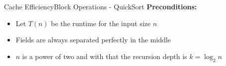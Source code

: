 


\begin{frame}{Cache Efficiency}{Block Operations - QuickSort}
  \textbf{Preconditions:}
  \begin{itemize}
    \item
      Let {\color{Mittel-Blau}$T(n)$} be the runtime for the
      {\color{Mittel-Blau}input size $n$}
    \item
      Fields are always separated perfectly in the middle
    \item
      $n$ is a power of two and with that the
      {\color{Mittel-Blau}recursion depth is $k = \log_2 n$}
  \end{itemize}
\end{frame}


